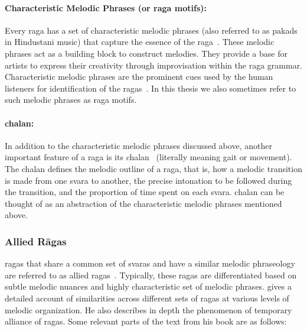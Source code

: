 \paragraph{Characteristic Melodic Phrases (or \gls{raga} motifs):} Every \gls{raga} has a set of characteristic melodic phrases (also referred to as pakads in Hindustani music) that capture the essence of the \gls{raga}~\citep{Bagchee1998,rao1999raga,Viswanathan2004}. These melodic phrases act as a building block to construct melodies. They provide a base for artists to express their creativity through improvisation within the \gls{raga} grammar. Characteristic melodic phrases are the prominent cues used by the human listeners for identification of the \glspl{raga}~\citep{krishna2012carnatic,Suvarnalata2014}. In this thesis we also sometimes refer to such melodic phrases as \gls{raga} motifs.

\paragraph{\Gls{chalan}:} In addition to the characteristic melodic phrases discussed above, another important feature of a \gls{raga} is its \gls{chalan}~\citep{rao1999raga,Bagchee1998,Suvarnalata2014} (literally meaning gait or movement). The \gls{chalan} defines the melodic outline of a \gls{raga}, that is, how a melodic transition is made from one \gls{svara} to another, the precise intonation to be followed during the transition, and the proportion of time spent on each \gls{svara}. \Gls{chalan} can be thought of as an abstraction of the characteristic melodic phrases mentioned above.

\subsubsection{Allied R\={a}gas}
\label{sec:allied_ragas}

\Glspl{raga} that share a common set of \glspl{svara} and have a similar melodic phraseology are referred to as allied \glspl{raga}~\citep{krishna2012carnatic}. Typically, these \glspl{raga} are differentiated based on subtle melodic nuances and highly characteristic set of melodic phrases. \cite[p. 74-76]{meer1980hindustani} gives a detailed account of similarities across different sets of \glspl{raga} at various levels of melodic organization. He also describes in depth the phenomenon of temporary alliance of \glspl{raga}. Some relevant parts of the text from his book are as follows: 

